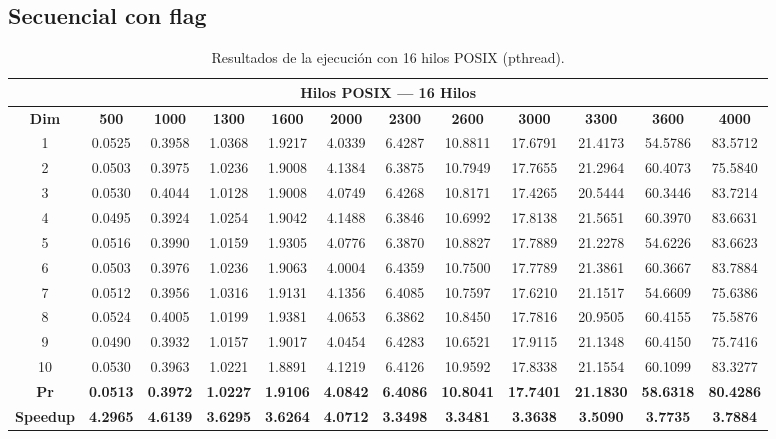 \documentclass{article}
\begin{document}

\subsection{Secuencial con flag}

\begin{table}[H]
\centering
\tiny
\begin{tabular}{|c|c|c|c|c|c|c|c|c|c|c|c|}
\hline
\multicolumn{12}{|c|}{\textbf{Hilos POSIX --- 16 Hilos}} \\
\hline
\textbf{Dim} & \textbf{500} & \textbf{1000} & \textbf{1300} & \textbf{1600} & \textbf{2000} & \textbf{2300} & \textbf{2600} & \textbf{3000} & \textbf{3300} & \textbf{3600} & \textbf{4000} \\
\hline
1  & 0.0525 & 0.3958 & 1.0368 & 1.9217 & 4.0339 & 6.4287 & 10.8811 & 17.6791 & 21.4173 & 54.5786 & 83.5712 \\
2  & 0.0503 & 0.3975 & 1.0236 & 1.9008 & 4.1384 & 6.3875 & 10.7949 & 17.7655 & 21.2964 & 60.4073 & 75.5840 \\
3  & 0.0530 & 0.4044 & 1.0128 & 1.9008 & 4.0749 & 6.4268 & 10.8171 & 17.4265 & 20.5444 & 60.3446 & 83.7214 \\
4  & 0.0495 & 0.3924 & 1.0254 & 1.9042 & 4.1488 & 6.3846 & 10.6992 & 17.8138 & 21.5651 & 60.3970 & 83.6631 \\
5  & 0.0516 & 0.3990 & 1.0159 & 1.9305 & 4.0776 & 6.3870 & 10.8827 & 17.7889 & 21.2278 & 54.6226 & 83.6623 \\
6  & 0.0503 & 0.3976 & 1.0236 & 1.9063 & 4.0004 & 6.4359 & 10.7500 & 17.7789 & 21.3861 & 60.3667 & 83.7884 \\
7  & 0.0512 & 0.3956 & 1.0316 & 1.9131 & 4.1356 & 6.4085 & 10.7597 & 17.6210 & 21.1517 & 54.6609 & 75.6386 \\
8  & 0.0524 & 0.4005 & 1.0199 & 1.9381 & 4.0653 & 6.3862 & 10.8450 & 17.7816 & 20.9505 & 60.4155 & 75.5876 \\
9  & 0.0490 & 0.3932 & 1.0157 & 1.9017 & 4.0454 & 6.4283 & 10.6521 & 17.9115 & 21.1348 & 60.4150 & 75.7416 \\
10 & 0.0530 & 0.3963 & 1.0221 & 1.8891 & 4.1219 & 6.4126 & 10.9592 & 17.8338 & 21.1554 & 60.1099 & 83.3277 \\
\hline
\textbf{Pr} & \textbf{0.0513} & \textbf{0.3972} & \textbf{1.0227} & \textbf{1.9106} & \textbf{4.0842} & \textbf{6.4086} & \textbf{10.8041} & \textbf{17.7401} & \textbf{21.1830} & \textbf{58.6318} & \textbf{80.4286} \\
\hline
\textbf{Speedup} & \textbf{4.2965} & \textbf{4.6139} & \textbf{3.6295} & \textbf{3.6264} & \textbf{4.0712} & \textbf{3.3498} & \textbf{3.3481} & \textbf{3.3638} & \textbf{3.5090} & \textbf{3.7735} & \textbf{3.7884} \\
\hline
\end{tabular}
\label{tab:t16}
\caption{Resultados de la ejecución con 16 hilos POSIX (pthread).}
\end{table}
\end{document}
